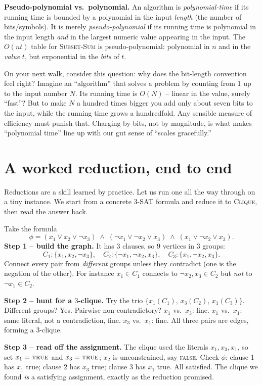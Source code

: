 \begin{formalbox}
\textbf{Pseudo-polynomial vs.\ polynomial.} An algorithm is
\emph{polynomial-time} if its running time is bounded by a polynomial in the
input \emph{length} (the number of bits/symbols). It is merely
\emph{pseudo-polynomial} if its running time is polynomial in the input length
\emph{and} in the largest numeric value appearing in the input. The
$O(nt)$ table for \textsc{Subset-Sum} is pseudo-polynomial: polynomial in $n$ and
in the \emph{value} $t$, but exponential in the \emph{bits} of $t$.
\end{formalbox}

\begin{walkbox}
On your next walk, consider this question: why does the bit-length convention feel right?
Imagine an ``algorithm'' that solves a problem by counting from $1$ up to the
input number $N$. Its running time is $O(N)$ -- linear in the value, surely
``fast''? But to make $N$ a hundred times bigger you add only about seven bits to
the input, while the running time grows a hundredfold. Any sensible measure of
efficiency must punish that. Charging by bits, not by magnitude, is what makes
``polynomial time'' line up with our gut sense of ``scales gracefully.''
\end{walkbox}

\section{A worked reduction, end to end}

Reductions are a skill learned by practice. Let us run one all the way through
on a tiny instance. We start from a concrete \textsc{3-SAT} formula and reduce it to
\textsc{Clique}, then read the answer back.

\begin{labbox}
Take the formula
\[
  \phi = (x_1 \vee x_2 \vee \neg x_3)\;\wedge\;
         (\neg x_1 \vee \neg x_2 \vee x_3)\;\wedge\;
         (x_1 \vee \neg x_2 \vee x_3).
\]
\textbf{Step 1 -- build the graph.} It has $3$ clauses, so $9$ vertices in $3$
groups:
\[
  C_1: \{x_1, x_2, \neg x_3\}, \quad
  C_2: \{\neg x_1, \neg x_2, x_3\}, \quad
  C_3: \{x_1, \neg x_2, x_3\}.
\]
Connect every pair from \emph{different} groups unless they contradict (one is the
negation of the other). For instance $x_1\in C_1$ connects to $\neg x_2, x_3\in
C_2$ but \emph{not} to $\neg x_1\in C_2$.

\textbf{Step 2 -- hunt for a $3$-clique.} Try the trio
$\{x_1(C_1),\, x_3(C_2),\, x_1(C_3)\}$. Different groups? Yes. Pairwise
non-contradictory? $x_1$ vs.\ $x_3$: fine. $x_1$ vs.\ $x_1$: same literal, not a
contradiction, fine. $x_3$ vs.\ $x_1$: fine. All three pairs are edges, forming a
$3$-clique.

\textbf{Step 3 -- read off the assignment.} The clique used the literals $x_1,
x_3, x_1$, so set $x_1 = \textsc{true}$ and $x_3 = \textsc{true}$; $x_2$ is
unconstrained, say \textsc{false}. Check $\phi$: clause $1$ has $x_1$ true; clause
$2$ has $x_3$ true; clause $3$ has $x_1$ true. All satisfied. The clique we found
\emph{is} a satisfying assignment, exactly as the reduction promised.
\end{labbox}


